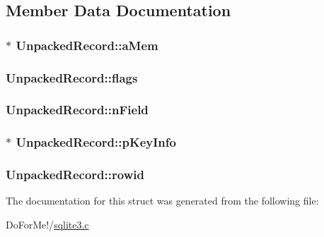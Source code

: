 \subsection{Member Data Documentation}
\hypertarget{struct_unpacked_record_a3299c322ceb8b758dacc59701021ae9f}{
\subsubsection[{a\-Mem}]{$\ast$ Unpacked\-Record\-::a\-Mem}}\label{struct_unpacked_record_a3299c322ceb8b758dacc59701021ae9f}
\hypertarget{struct_unpacked_record_ab24dd1a413192bae21ec613ca3b239a1}{
\subsubsection[{flags}]{ Unpacked\-Record\-::flags}}\label{struct_unpacked_record_ab24dd1a413192bae21ec613ca3b239a1}
\hypertarget{struct_unpacked_record_a2c5062735cdbc5039679d255cc900668}{
\subsubsection[{n\-Field}]{ Unpacked\-Record\-::n\-Field}}\label{struct_unpacked_record_a2c5062735cdbc5039679d255cc900668}
\hypertarget{struct_unpacked_record_aeb43e7a1e300857cab2cbe98eacd575b}{
\subsubsection[{p\-Key\-Info}]{$\ast$ Unpacked\-Record\-::p\-Key\-Info}}\label{struct_unpacked_record_aeb43e7a1e300857cab2cbe98eacd575b}
\hypertarget{struct_unpacked_record_a5ec2064b28fcf43b46bf92a515e9203e}{
\subsubsection[{rowid}]{ Unpacked\-Record\-::rowid}}\label{struct_unpacked_record_a5ec2064b28fcf43b46bf92a515e9203e}


The documentation for this struct was generated from the following file\-:\begin{DoxyCompactItemize}
\item 
Do\-For\-Me!/\hyperlink{sqlite3_8c}{sqlite3.\-c}\end{DoxyCompactItemize}

